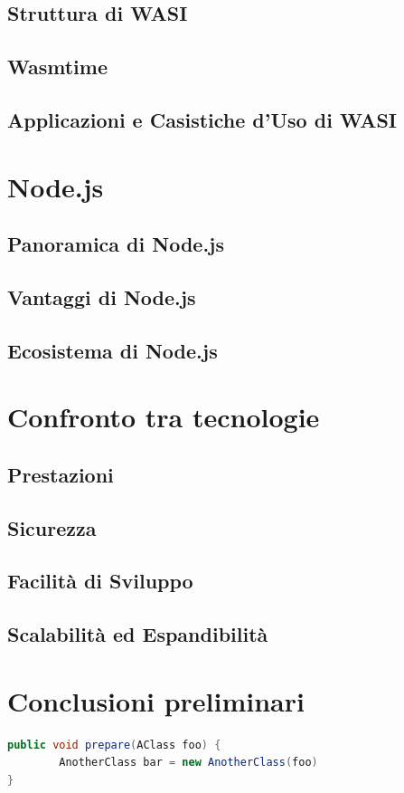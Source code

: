 \subsection{Struttura di WASI}
\subsection{Wasmtime}
\subsection{Applicazioni e Casistiche d'Uso di WASI}

\newpage
\section{Node.js}
\label{sec:Node}
\subsection{Panoramica di Node.js}
\subsection{Vantaggi di Node.js}
\subsection{Ecosistema di Node.js}

\newpage
\section{Confronto tra tecnologie}
\label{sec:Confronto}
\subsection{Prestazioni}
\subsection{Sicurezza}
\subsection{Facilità di Sviluppo}
\subsection{Scalabilità ed Espandibilità}

\newpage
\section{Conclusioni preliminari}
\label{sec:ConclusioniTecnologie}

\newpage


\begin{lstlisting}[language=Java, label=lst:java, caption={Some code in another language than the default one}]
public void prepare(AClass foo) {
        AnotherClass bar = new AnotherClass(foo)
}
\end{lstlisting}
